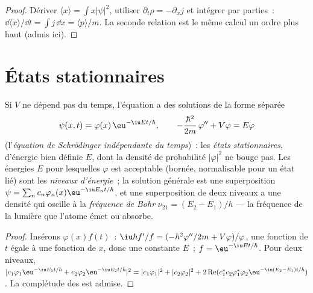 \begin{proof}
Dériver $\langle x\rangle = \int x|\psi|^2$, utiliser $\partial_t\rho =
-\partial_xj$ et intégrer par parties~: $\dd\langle x\rangle/\dd t = \int j\,\dd x
= \langle p\rangle/m$. La seconde relation est le même calcul un
ordre plus haut (admis ici).
\end{proof}

\section{États stationnaires}

\begin{theorem}\label{thm:b2:schrodinger-wave-functions:stationary}
Si $V$ ne dépend pas du temps, l'équation a des solutions de la
forme séparée
\[
\psi(x,t) = \varphi(x)\,\eu^{-\iu Et/\hbar}, \qquad
-\frac{\hbar^2}{2m}\,\varphi'' + V\varphi = E\varphi
\]
(l'\emph{équation de Schrödinger indépendante du temps})~: les \emph{états stationnaires}, d'énergie bien définie $E$, dont la densité de probabilité
$|\varphi|^2$ ne bouge pas. Les énergies $E$ pour lesquelles $\varphi$ est
acceptable (bornée, normalisable pour un état lié) sont les
\emph{niveaux d'énergie}~; la solution générale est une superposition $\psi =
\sum_nc_n\varphi_n(x)\eu^{-\iu E_nt/\hbar}$, et une superposition de deux niveaux
a une densité qui oscille à la \emph{fréquence de Bohr} $\nu_{21} = (E_2 - E_1)/h$ --- la fréquence de la lumière que
l'atome émet ou absorbe.
\end{theorem}

\begin{proof}
Insérons $\varphi(x)f(t)$~: $\iu\hbar f'/f = (-\hbar^2\varphi''/2m + V\varphi)/\varphi$,
une fonction de $t$ égale à une fonction de $x$, donc une constante $E$~; $f
= \eu^{-\iu Et/\hbar}$. Pour deux niveaux, $|c_1\varphi_1\eu^{-\iu E_1t/\hbar} +
c_2\varphi_2\eu^{-\iu E_2t/\hbar}|^2 = |c_1\varphi_1|^2 + |c_2\varphi_2|^2 +
2\operatorname{Re}(c_1^*c_2\varphi_1^*\varphi_2\eu^{-\iu(E_2 - E_1)t/\hbar})$.
La complétude des  est admise.
\end{proof}

